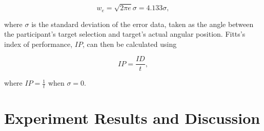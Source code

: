 \documentclass[sigconf, review=true, screen=true, anonymous=true]{acmart}
\begin{document}
\begin{equation}
  \label{eq:fitts-we}
  w_e = \sqrt{2\pi e}\sigma = 4.133\sigma,
\end{equation}

\noindent
where $\sigma$ is the standard deviation of the error data, taken as the angle between the participant's target selection and target's actual angular position.
Fitts's index of performance, $IP$, can then be calculated using 

\begin{equation}
  \label{eq:fitts-performance}
  IP = \frac{ID}{t},
\end{equation}

\noindent
where $IP = \frac{1}{t}$ when $\sigma=0$.

\section{Experiment Results and Discussion}
\label{sec:results}




\end{document}
